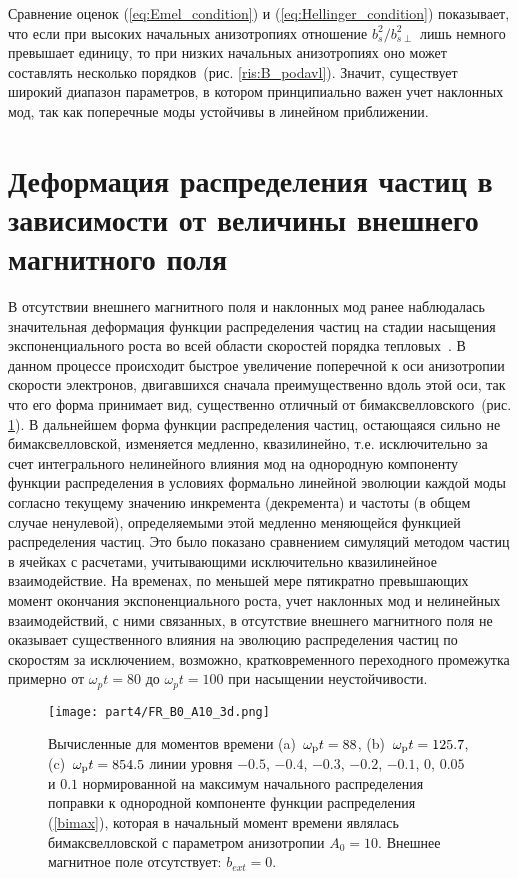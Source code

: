 Сравнение оценок (\ref{eq:Emel_condition}) и (\ref{eq:Hellinger_condition}) показывает, что если при высоких начальных анизотропиях отношение $ b_{s}^2/ b_{s\perp}^2$ лишь немного превышает единицу, то при низких начальных анизотропиях оно может составлять несколько порядков~(рис. \ref{ris:B_podavl}). Значит, существует широкий диапазон параметров, в котором принципиально важен учет наклонных мод, так как поперечные моды устойчивы в линейном приближении.

\section{Деформация распределения частиц в зависимости от величины  внешнего магнитного поля}
\label{part_evol_distr_func}
В отсутствии внешнего магнитного поля и наклонных мод ранее наблюдалась значительная деформация функции распределения частиц на стадии насыщения экспоненциального роста во всей области скоростей порядка тепловых~\cite{Kuznetsov2023}. В данном процессе происходит быстрое увеличение поперечной к оси анизотропии скорости электронов, двигавшихся сначала преимущественно вдоль этой оси, так что его форма принимает вид, существенно отличный от бимаксвелловского~(рис. \ref{ris:FR_A10_3d_B0}). В дальнейшем форма функции распределения частиц, остающаяся сильно не бимаксвелловской, изменяется медленно, квазилинейно, т.е. исключительно за счет интегрального нелинейного влияния мод на однородную компоненту функции распределения в условиях формально линейной эволюции каждой моды согласно текущему значению инкремента (декремента) и частоты (в общем случае ненулевой), определяемыми этой медленно меняющейся функцией распределения частиц. Это было показано сравнением симуляций методом частиц в ячейках с расчетами, учитывающими исключительно квазилинейное взаимодействие. На временах, по меньшей мере пятикратно превышающих момент окончания экспоненциального роста, учет наклонных мод и нелинейных взаимодействий, с ними связанных, в отсутствие внешнего магнитного поля не оказывает существенного влияния на эволюцию распределения частиц по скоростям за исключением, возможно, кратковременного переходного промежутка примерно от $\omega_pt=80$ до $\omega_pt=100$ при насыщении неустойчивости. 


\begin{figure}[h!]
\texttt{[image: part4/FR\_B0\_A10\_3d.png]}
\caption{Вычисленные для моментов времени (a)~$\omega_\mathrm{p} t = 88$, (b)~$\omega_\mathrm{p} t = 125.7$, (c)~$\omega_\mathrm{p} t = 854.5$ линии уровня $-0.5$, $-0.4$, $-0.3$, $-0.2$, $-0.1$, $0$, $0.05$ и $0.1$ нормированной на максимум начального распределения поправки к однородной компоненте функции распределения (\ref{bimax}), которая в начальный момент времени являлась бимаксвелловской с параметром анизотропии $A_0=10$. Внешнее магнитное поле отсутствует: $b_{ext}=0$.}
\label{ris:FR_A10_3d_B0}
\end{figure}



